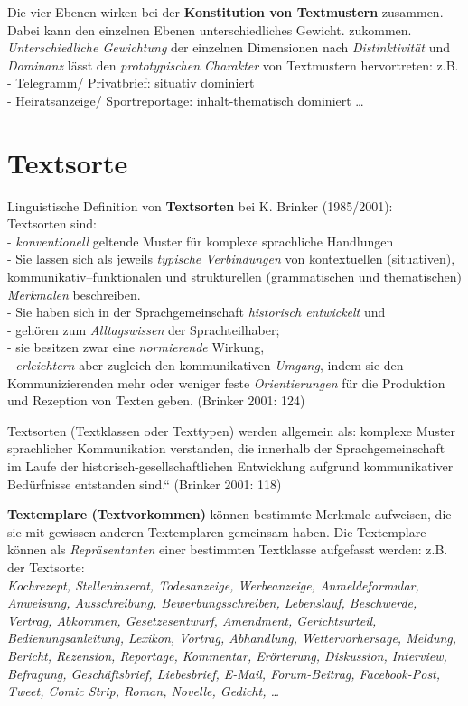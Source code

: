 \documentclass[
  letterpaper,
]{scrbook}
\begin{document}
Die vier Ebenen wirken bei der \textbf{Konstitution von Textmustern}
zusammen. Dabei kann den einzelnen Ebenen unterschiedliches Gewicht.
zukommen. \emph{Unterschiedliche Gewichtung} der einzelnen Dimensionen
nach \emph{Distinktivität} und \emph{Dominanz} lässt den
\emph{prototypischen Charakter} von Textmustern hervortreten: z.B.\\
- Telegramm/ Privatbrief: situativ dominiert\\
- Heiratsanzeige/ Sportreportage: inhalt-thematisch dominiert \ldots{}\\

\hypertarget{textsorte}{%
\section{Textsorte}\label{textsorte}}

Linguistische Definition von \textbf{Textsorten} bei K. Brinker
(1985/2001):\\
Textsorten sind:\\
- \emph{konventionell} geltende Muster für komplexe sprachliche
Handlungen\\
- Sie lassen sich als jeweils \emph{typische Verbindungen} von
kontextuellen (situativen), kommunikativ--funktionalen und strukturellen
(grammatischen und thematischen) \emph{Merkmalen} beschreiben.\\
- Sie haben sich in der Sprachgemeinschaft \emph{historisch entwickelt}
und\\
- gehören zum \emph{Alltagswissen} der Sprachteilhaber;\\
- sie besitzen zwar eine \emph{normierende} Wirkung,\\
- \emph{erleichtern} aber zugleich den kommunikativen \emph{Umgang},
indem sie den Kommunizierenden mehr oder weniger feste
\emph{Orientierungen} für die Produktion und Rezeption von Texten geben.
(Brinker 2001: 124)

Textsorten (Textklassen oder Texttypen) werden allgemein als: komplexe
Muster sprachlicher Kommunikation verstanden, die innerhalb der
Sprachgemeinschaft im Laufe der historisch-gesellschaftlichen
Entwicklung aufgrund kommunikativer Bedürfnisse entstanden sind.``
(Brinker 2001: 118)

\textbf{Textemplare (Textvorkommen)} können bestimmte Merkmale
aufweisen, die sie mit gewissen anderen Textemplaren gemeinsam haben.
Die Textemplare können als \emph{Repräsentanten} einer bestimmten
Textklasse aufgefasst werden: z.B. der Textsorte:\\
\emph{Kochrezept, Stelleninserat, Todesanzeige, Werbeanzeige,
Anmeldeformular, Anweisung, Ausschreibung, Bewerbungsschreiben,
Lebenslauf, Beschwerde, Vertrag, Abkommen, Gesetzesentwurf, Amendment,
Gerichtsurteil, Bedienungsanleitung, Lexikon, Vortrag, Abhandlung,
Wettervorhersage, Meldung, Bericht, Rezension, Reportage, Kommentar,
Erörterung, Diskussion, Interview, Befragung, Geschäftsbrief,
Liebesbrief, E-Mail, Forum-Beitrag, Facebook-Post, Tweet, Comic Strip,
Roman, Novelle, Gedicht, \ldots{}}
\end{document}
